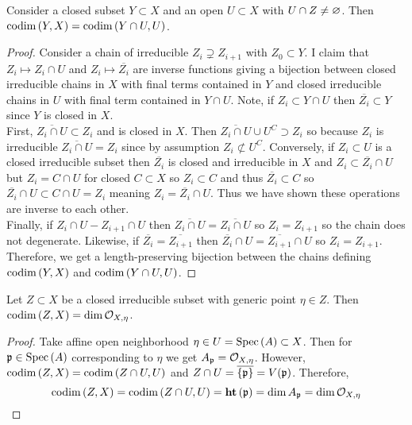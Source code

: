 \documentclass[12pt]{article}
\begin{document}
\begin{lemma} \label{codimension_opens}
Consider a closed subset $Y \subset X$ and an open $U \subset X$ with $U \cap Z \neq \varnothing$. Then $\mathrm{codim}\left( Y, X \right) = \mathrm{codim}\left( Y \cap U, U \right)$. 
\end{lemma}

\begin{proof}
Consider a chain of irreducible $Z_i \supsetneq Z_{i+1}$ with $Z_0 \subset Y$. I claim that $Z_i \mapsto Z_i \cap U$ and $Z_i \mapsto \overline{Z_i}$ are inverse functions giving a bijection between closed irreducible chains in $X$ with final terms contained in $Y$ and closed irreducible chains in $U$ with final term contained in $Y \cap  U$. Note, if $Z_i \subset Y \cap U$ then $\overline{Z_i} \subset Y$ since $Y$ is closed in $X$.
\bigskip\\
First, $\overline{Z_i \cap U} \subset Z_i$ and is closed in $X$. Then $\overline{Z_i \cap U} \cup U^C \supset Z_i$ so because $Z_i$ is irreducible $\overline{Z_i \cap U} = Z_i$ since by assumption $Z_i \not\subset U^C$. Conversely, if $Z_i \subset U$ is a closed irreducible subset then $\overline{Z_i}$ is closed and irreducible in $X$ and $Z_i \subset \overline{Z_i} \cap U$ but $Z_i = C \cap U$ for closed $C \subset X$ so $Z_i \subset C$ and thus $\overline{Z_i} \subset C$ so $\overline{Z_i} \cap U \subset C \cap U = Z_i$ meaning $Z_i = \overline{Z_i} \cap U$. Thus we have shown these operations are inverse to each other.
\bigskip\\
Finally, if $Z_i \cap U - Z_{i+1} \cap U$ then $\overline{Z_i \cap U} = \overline{Z_i \cap U}$ so $Z_i = Z_{i+1}$ so the chain does not degenerate. Likewise, if $\overline{Z_i} = \overline{Z_{i+1}}$ then $\overline{Z_i} \cap U = \overline{Z_{i+1}} \cap U$ so $Z_i = Z_{i+1}$. Therefore, we get a length-preserving bijection between the chains defining $\mathrm{codim}\left( Y,X \right)$ and $\mathrm{codim}\left( Y \cap U, U \right)$. 
\end{proof}

\begin{lemma} \label{codimension_loc_rings}
Let $Z \subset X$ be a closed irreducible subset with generic point $\eta \in Z$. Then $\mathrm{codim}\left( Z,X \right) = \dim{\mathcal{O}_{X, \eta}}$. 
\end{lemma}

\begin{proof}
Take affine open neighborhood $\eta \in U = \mathrm{Spec}\left( A \right) \subset X$. Then for $\mathfrak{p} \in \mathrm{Spec}\left( A \right)$ corresponding to $\eta$ we get $A_{\mathfrak{p}} = \mathcal{O}_{X, \eta}$. However, $\mathrm{codim}\left( Z, X \right) = \mathrm{codim}\left( Z \cap U, U \right)$ and $Z \cap U = \overline{\{ \mathfrak{p} \}} = V(\mathfrak{p})$. Therefore,
\[ \mathrm{codim}\left( Z, X \right) = \mathrm{codim}\left( Z \cap U, U \right) = \mathbf{ht}\left( \mathfrak{p} \right) = \dim{A_{\mathfrak{p}}} = \dim{\mathcal{O}_{X, \eta}} \]
\end{proof}
\end{document}

